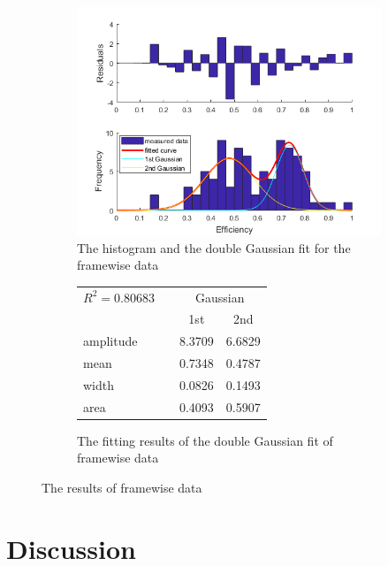 \documentclass[a4paper,english,12pt,bibliography=totoc]{scrreprt}
\begin{document}
\begin{figure}[H]
  \begin{subfigure}{0.45\textwidth}
    \centering
    \includegraphics[width=\textwidth]{moleculewise_plot.png}
    \caption{The histogram and the double Gaussian fit for the framewise data}
  \end{subfigure}
  \begin{subfigure}{0.45\textwidth}
    \centering

    \begin{tabular}{lccc}
      $R^2 = 0.80683$ &  & \multicolumn{2}{c}{Gaussian} \\ \cline{3-4}
      & & 1st & 2nd \\ 
      \hline
      amplitude &  & 8.3709 & 6.6829 \\
      mean &  & 0.7348  & 0.4787 \\
      width  &  & 0.0826  & 0.1493 \\
      area &  & 0.4093  & 0.5907 
    \end{tabular}

    \caption{The fitting results of the double Gaussian fit of framewise data}
  \end{subfigure}
  \caption{The results of framewise data}
\end{figure}


\section{Discussion}
\label{sec:Discussion} 
\end{document}

